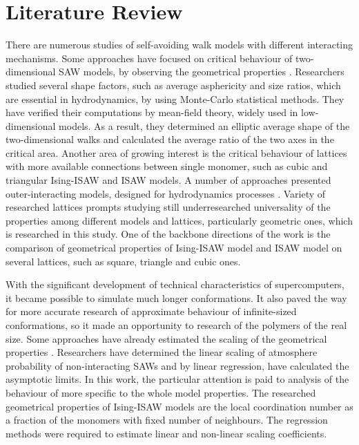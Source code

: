 
\section{Literature Review}

There are numerous studies of self-avoiding walk models with different interacting mechanisms. 
Some approaches have focused on critical behaviour of two-dimensional SAW models, by observing the geometrical properties \cite{Caracciolo2011, owczarek2000first, arkin2013gyration}. 
Researchers studied several shape factors, such as average asphericity and size ratios, which are essential in hydrodynamics, by using Monte-Carlo statistical methods. 
They have verified their computations by mean-field theory, widely used in low-dimensional models. 
As a result, they determined an elliptic average shape of the two-dimensional walks and calculated the average ratio of the two axes in the critical area.
Another area of growing interest is the critical behaviour of lattices with more available connections between single monomer, such as cubic and triangular Ising-ISAW \cite{Foster2021} and ISAW \cite{Tesi1996, Privman1986} models. 
A number of approaches presented outer-interacting models, designed for hydrodynamics processes \cite{LivneSAW1988, madras1988pivot}. 
Variety of researched lattices prompts studying still underresearched universality of the properties among different models and lattices, particularly geometric ones, which is researched in this study. 
One of the backbone directions of the work is the comparison of geometrical properties of Ising-ISAW model and ISAW model on several lattices, such as square, triangle and cubic ones.

With the significant development of technical characteristics of supercomputers, it became possible to simulate much longer conformations. 
It also paved the way for more accurate research of approximate behaviour of infinite-sized conformations, so it made an opportunity to research of the polymers of the real size. 
Some approaches have already estimated the scaling of the geometrical properties \cite{owczarek2008scaling}. 
Researchers have determined the linear scaling of atmosphere probability of non-interacting SAWs and by linear regression, have calculated the asymptotic limits. 
In this work, the particular attention is paid to analysis of the behaviour of more specific to the whole model properties. 
The researched geometrical properties of Ising-ISAW models are the local coordination number as a fraction of the monomers with fixed number of neighbours. 
The regression methods were required to estimate linear and non-linear scaling coefficients.
